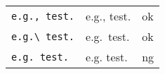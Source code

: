 \documentclass[preview]{standalone}
\newcommand{\tA}[1]{\textcolor{cA}{#1}}
\newcommand{\tD}[1]{\textcolor{cD}{#1}}
\begin{document}
\begin{table}[h]
    \centering
    \begin{tabular}{lll}
        \verb|e.g., test.| & e.g., test. & \tA{ok} \\
        \verb|e.g.\ test.| & e.g.\ test. & \tA{ok} \\
        \verb|e.g. test.|  & e.g. test.  & \tD{ng} \\
    \end{tabular}
\end{table}
\end{document}
